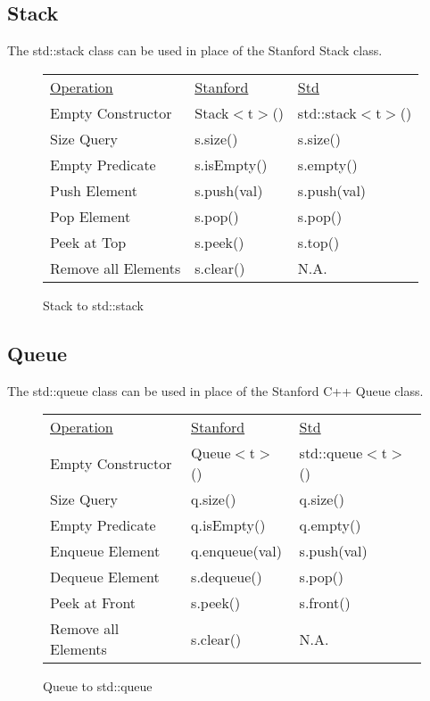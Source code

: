 \documentclass[nobib]{tufte-handout}
\begin{document}
\subsection*{Stack}

The std::stack class can be used in place of the Stanford Stack class.

\begin{figure}[!htbp]
\begin{tabular}{lll}
  \underline{Operation} & \underline{Stanford} & \underline{Std} \\
  Empty Constructor & Stack$<$t$>$() & std::stack$<$t$>$() \\ %
  Size Query & s.size() & s.size() \\ %
  Empty Predicate & s.isEmpty() & s.empty() \\ %
  Push Element & s.push(val) & s.push(val) \\ %
  Pop Element & s.pop() & s.pop() \\ %
  Peek at Top & s.peek() & s.top() \\ %
  Remove all Elements & s.clear() & N.A. \\ %
\end{tabular}
\caption{Stack to std::stack}
\end{figure}

\newpage \thispagestyle{empty}

\subsection*{Queue}

The std::queue class can be used in place of the Stanford C++ Queue class.

\begin{figure}[!htbp]
\begin{tabular}{lll}
  \underline{Operation} & \underline{Stanford} & \underline{Std} \\
  Empty Constructor & Queue$<$t$>$() & std::queue$<$t$>$() \\ %
  Size Query & q.size() & q.size() \\ %
  Empty Predicate & q.isEmpty() & q.empty() \\ %
  Enqueue Element & q.enqueue(val) & s.push(val) \\ %
  Dequeue Element & s.dequeue() & s.pop() \\ %
  Peek at Front & s.peek() & s.front() \\ %
  Remove all Elements & s.clear() & N.A. \\ %
\end{tabular}
\caption{Queue to std::queue}
\end{figure}
\end{document}
